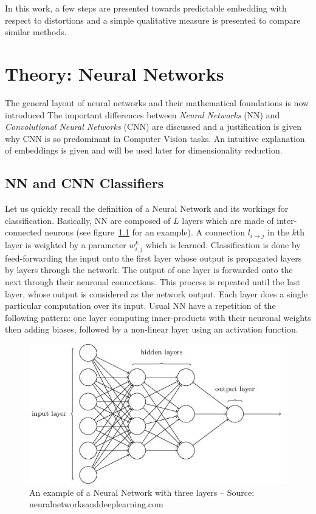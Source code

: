 \documentclass[a4paper,12pt]{report}
\begin{document}
In this work, a few steps are presented towards predictable embedding with respect to distortions and a simple qualitative measure is presented to compare similar methods.


\chapter{Theory: Neural Networks}
\label{chap:neural_network}
The general layout of neural networks and their mathematical foundations is now introduced
The important differences between {\em Neural Networks} (NN) and {\em Convolutional Neural Networks} (CNN) are discussed and a justification is given why CNN is so predominant in Computer Vision tasks.
An intuitive explanation of embeddings is given and will be used later for dimensionality reduction.

\section{NN and CNN Classifiers}

Let us quickly recall the definition of a Neural Network and its workings for classification.
Basically, NN are composed of $L$ layers which are made of inter-connected neurons (see figure~\ref{fig:neural_network} for an example).
A connection $l_{i \rightarrow j}$ in the $k$th layer is weighted by a parameter $w^k_{i,j}$ which is learned.
Classification is done by feed-forwarding the input onto the first layer whose output is propagated layers by layers through the network.
The output of one layer is forwarded onto the next through their neuronal connections.
This process is repeated until the last layer, whose output is considered as the network output.
Each layer does a single particular computation over its input.
Usual NN have a repetition of the following pattern: one layer computing inner-products with their neuronal weights then adding biases, followed by a non-linear layer using an activation function.

\begin{figure}[t]
    \begin{center}
        \includegraphics{thesis_figures/NN.jpg}
    \end{center}
    \caption{An example of a Neural Network with three layers -- Source: neuralnetworksanddeeplearning.com}
    \label{fig:neural_network}
\end{figure}
\end{document}
